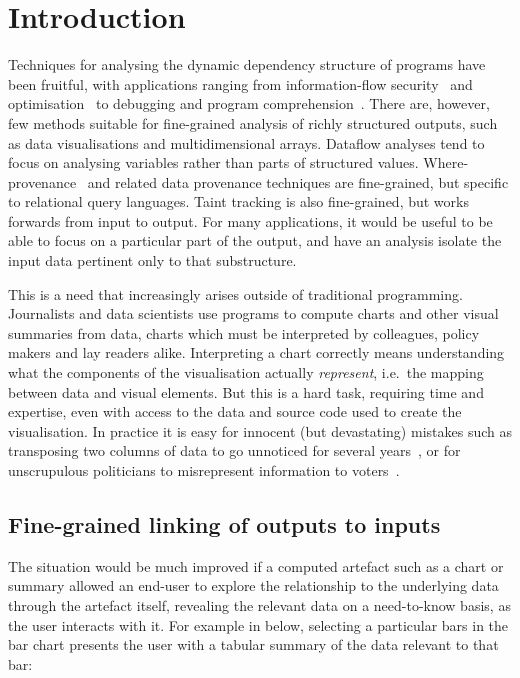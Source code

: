 \section{Introduction}

Techniques for analysing the dynamic dependency structure of programs have been fruitful, with applications ranging from information-flow security~\cite{sabelfeld03} and optimisation~\cite{kildall73} to debugging and program comprehension~\cite{weiser81,delucia96}. There are, however, few methods suitable for fine-grained analysis of richly structured outputs, such as data visualisations and multidimensional arrays. Dataflow analyses \cite{reps95} tend to focus on analysing variables rather than parts of structured values. Where-provenance~\cite{buneman01} and related data provenance techniques are fine-grained, but specific to relational query languages. Taint tracking \cite{newsome05} is also fine-grained, but works forwards from input to output. For many applications, it would be useful to be able to focus on a particular part of the output, and have an analysis isolate the input data pertinent only to that substructure.

This is a need that increasingly arises outside of traditional programming. Journalists and data scientists use programs to compute charts and other visual summaries from data, charts which must be interpreted by colleagues, policy makers and lay readers alike. Interpreting a chart correctly means understanding what the components of the visualisation actually \emph{represent}, i.e.~the mapping between data and visual elements. But this is a hard task, requiring time and expertise, even with access to the data and source code used to create the visualisation. In practice it is easy for innocent (but devastating) mistakes such as transposing two columns of data to go unnoticed for several years~\cite{miller06}, or for unscrupulous politicians to misrepresent information to voters~\cite{fullfact19}.

\subsection{Fine-grained linking of outputs to inputs}

The situation would be much improved if a computed artefact such as a chart or summary allowed an end-user to explore the relationship to the underlying data through the artefact itself, revealing the relevant data on a need-to-know basis, as the user interacts with it. For example in  below, selecting a particular bars in the bar chart presents the user with a tabular summary of the data relevant to that bar:

